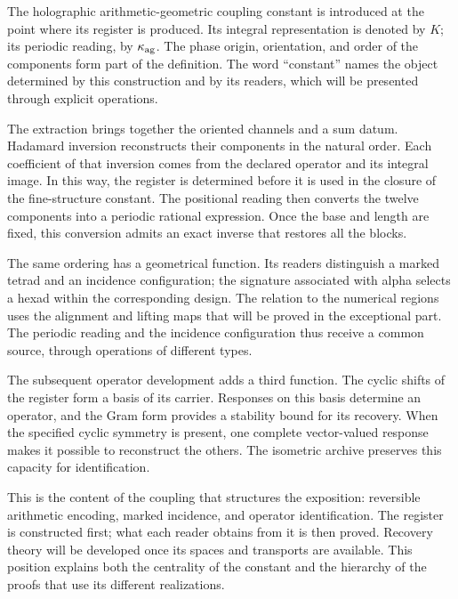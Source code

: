 
The holographic arithmetic-geometric coupling constant is introduced at the
point where its register is produced. Its integral representation is denoted
by \(K\); its periodic reading, by \(\kappa_{\rm ag}\). The phase
origin, orientation, and order of the components form part of the definition.
The word ``constant'' names the object determined by this construction and
by its readers, which will be presented through explicit operations.

The extraction brings together the oriented channels and a sum datum.
Hadamard inversion reconstructs their components in the natural order.
Each coefficient of that inversion comes from the declared operator and
its integral image. In this way, the register is determined before it is
used in the closure of the fine-structure constant. The positional reading
then converts the twelve components into a periodic rational expression.
Once the base and length are fixed, this conversion admits an exact inverse
that restores all the blocks.

The same ordering has a geometrical function. Its readers distinguish a
marked tetrad and an incidence configuration; the signature associated with
alpha selects a hexad within the corresponding design. The relation to the
numerical regions uses the alignment and lifting maps that will be proved
in the exceptional part. The periodic reading and the incidence
configuration thus receive a common source, through operations of different
types.

The subsequent operator development adds a third function. The cyclic shifts
of the register form a basis of its carrier. Responses on this basis
determine an operator, and the Gram form provides a stability bound for its
recovery. When the specified cyclic symmetry is present, one complete
vector-valued response makes it possible to reconstruct the others. The
isometric archive preserves this capacity for identification.

This is the content of the coupling that structures the exposition:
reversible arithmetic encoding, marked incidence, and operator
identification. The register is constructed first; what each reader obtains
from it is then proved. Recovery theory will be developed once its spaces
and transports are available. This position explains both the centrality
of the constant and the hierarchy of the proofs that use its different
realizations.
